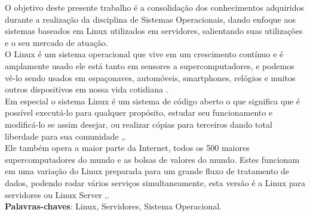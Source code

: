 
\setlength{\absparsep}{18pt} %
\begin{resumo}
    O objetivo deste presente trabalho é a consolidação dos conhecimentos adquiridos durante a realização da disciplina de Sistemas Operacionais, dando enfoque aos sistemas baseados em Linux utilizados em servidores, salientando suas utilizações e o seu mercado de atuação. \\
    O Linux é um sistema operacional que vive em um crescimento contínuo e é amplamente usado ele está tanto em sensores a supercomputadores, e podemos vê-lo sendo usados em espaçonaves, automóveis, smartphones, relógios e muitos outros dispositivos em nossa vida cotidiana \cite{LinuxFundationWIL}.\\
    Em especial o sistema Linux é um sistema de código aberto o que significa que é possível executá-lo para qualquer propósito, estudar seu funcionamento e modificá-lo se assim desejar, ou realizar cópias para terceiros dando total liberdade para sua comunidade \cite{LinuxFundationWIL},\cite{Morimoto2011}.\\
    Ele também opera a maior parte da Internet, todos os 500 maiores supercomputadores do mundo e as bolsas de valores do mundo. Estes funcionam em uma variação do Linux preparada para um grande fluxo de tratamento de dados, podendo rodar vários serviços simultaneamente, esta versão é a Linux para servidores ou Linux Server \cite{LinuxFundationWIL},\cite{Morimoto2011}.\\





 \textbf{Palavras-chaves}: Linux, Servidores, Sistema Operacional.
\end{resumo}


 
